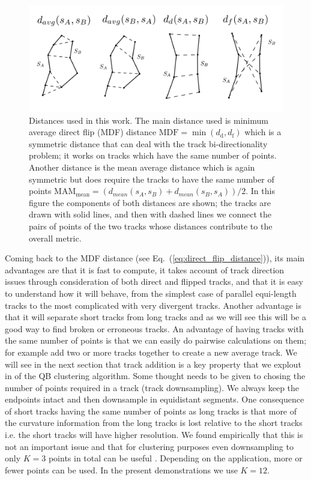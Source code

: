 \documentclass[preprint,authoryear,a4paper,10pt,onecolumn]{elsarticle}
\begin{document}
\begin{figure}
\includegraphics[scale=0.6]{distances}
\centering{}\caption{Distances used in this work. The main distance used is minimum average
direct flip (MDF) distance $\textrm{MDF}=\min(d_{\textrm{d}},d_{\textrm{f}})$
which is a symmetric distance that can deal with the track bi-directionality
problem; it works on tracks which have the same number of points.
Another distance is the mean average distance which is again symmetric
but does require the tracks to have the same number of points
$\textrm{MAM}_{\textrm{mean}}=(d_{mean}(s_{A},s_{B})+d_{mean}(s_{B},s_{A}))/2$.
In this figure the components of both distances are shown; the tracks are drawn with solid
lines, and then with dashed lines we connect the
pairs of points of the two tracks whose distances contribute to the
overall metric.\label{Flo:Distances_used}}
\end{figure}

Coming back to the MDF distance (see Eq.~(\ref{eq:direct_flip_distance})),
its main advantages are that it is fast to compute, it takes account of
track direction issues through consideration of both direct and flipped
tracks, and that it is easy to understand how it will behave, from the
simplest case of parallel equi-length tracks to the most complicated
with very divergent tracks. Another advantage is that it will separate
short tracks from long tracks and as we will see this will be a good way
to find broken or erroneous tracks. An advantage of having tracks with
the same number of points is that we can easily do pairwise calculations
on them; for example add two or more tracks together to create a new
average track. We will see in the next section that track addition is a
key property that we explout in of the QB clustering algorithm.  Some
thought needs to be given to chosing the number of points
required in a track (track downsampling). We always keep the endpoints
intact and then downsample in equidistant segments. One consequence of short
tracks having the same number of points as long tracks is that more
of the curvature information from the long tracks is lost relative to the short
tracks i.e. the short tracks will have higher resolution.  We found
empirically that this is not an important issue and that for clustering
purposes even downsampling to only $K=3$ points in total can be useful
\citep{EGMB10}. Depending on the application, more or fewer points can be
used. In the present demonstrations we use $K=12$.
\end{document}
